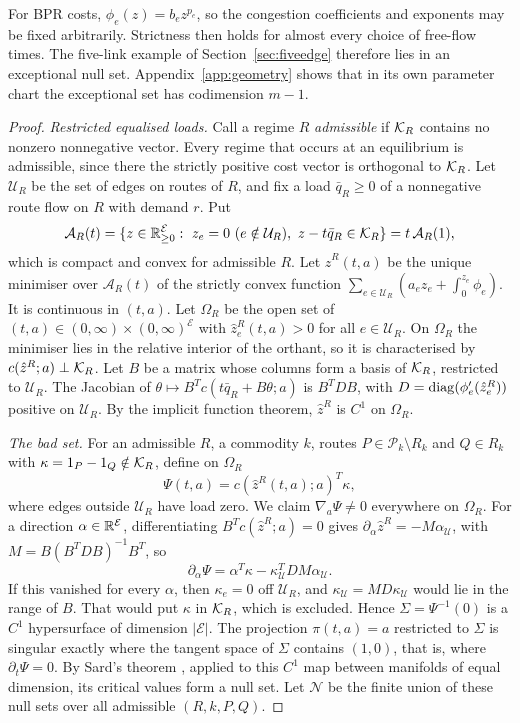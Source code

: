 For BPR costs, $\phi_e(z)=b_ez^{p_e}$, so the congestion coefficients and exponents may be fixed arbitrarily. Strictness then holds for almost every choice of free-flow times. The five-link example of Section~\ref{sec:fiveedge} therefore lies in an exceptional null set. Appendix~\ref{app:geometry} shows that in its own parameter chart the exceptional set has codimension $m-1$.

\begin{proof}
\emph{Restricted equalised loads.} Call a regime $R$ \emph{admissible} if $\mathcal K_R$ contains no nonzero nonnegative vector. Every regime that occurs at an equilibrium is admissible, since there the strictly positive cost vector is orthogonal to $\mathcal K_R$. Let $\mathcal U_R$ be the set of edges on routes of $R$, and fix a load $\bar q_R\ge0$ of a nonnegative route flow on $R$ with demand $r$. Put
\[
 \mathcal A_R(t)=\{z\in\mathbb R^{\mathcal E}_{\ge0}:\ z_e=0\ (e\notin\mathcal U_R),\ z-t\bar q_R\in\mathcal K_R\}=t\,\mathcal A_R(1),
\]
which is compact and convex for admissible $R$. Let $\hat z^R(t,a)$ be the unique minimiser over $\mathcal A_R(t)$ of the strictly convex function $\sum_{e\in\mathcal U_R}(a_ez_e+\int_0^{z_e}\phi_e)$. It is continuous in $(t,a)$. Let $\Omega_R$ be the open set of $(t,a)\in(0,\infty)\times(0,\infty)^{\mathcal E}$ with $\hat z^R_e(t,a)>0$ for all $e\in\mathcal U_R$. On $\Omega_R$ the minimiser lies in the relative interior of the orthant, so it is characterised by $c(\hat z^R;a)\perp\mathcal K_R$. Let $B$ be a matrix whose columns form a basis of $\mathcal K_R$, restricted to $\mathcal U_R$. The Jacobian of $\theta\mapsto B^Tc(t\bar q_R+B\theta;a)$ is $B^TDB$, with $D=\operatorname{diag}(\phi'_e(\hat z^R_e))$ positive on $\mathcal U_R$. By the implicit function theorem, $\hat z^R$ is $C^1$ on $\Omega_R$.

\emph{The bad set.} For an admissible $R$, a commodity $k$, routes $P\in\mathcal P_k\setminus R_k$ and $Q\in R_k$ with $\kappa=1_P-1_Q\notin\mathcal K_R$, define on $\Omega_R$
\[
 \Psi(t,a)=c(\hat z^R(t,a);a)^T\kappa,
\]
where edges outside $\mathcal U_R$ have load zero. We claim $\nabla_a\Psi\ne0$ everywhere on $\Omega_R$. For a direction $\alpha\in\mathbb R^{\mathcal E}$, differentiating $B^Tc(\hat z^R;a)=0$ gives $\partial_\alpha\hat z^R=-M\alpha_{\mathcal U}$, with $M=B(B^TDB)^{-1}B^T$, so
\[
 \partial_\alpha\Psi=\alpha^T\kappa-\kappa_{\mathcal U}^TDM\alpha_{\mathcal U}.
\]
If this vanished for every $\alpha$, then $\kappa_e=0$ off $\mathcal U_R$, and $\kappa_{\mathcal U}=MD\kappa_{\mathcal U}$ would lie in the range of $B$. That would put $\kappa$ in $\mathcal K_R$, which is excluded. Hence $\Sigma=\Psi^{-1}(0)$ is a $C^1$ hypersurface of dimension $|\mathcal E|$. The projection $\pi(t,a)=a$ restricted to $\Sigma$ is singular exactly where the tangent space of $\Sigma$ contains $(1,0)$, that is, where $\partial_t\Psi=0$. By Sard's theorem \cite{Sard1942}, applied to this $C^1$ map between manifolds of equal dimension, its critical values form a null set. Let $\mathcal N$ be the finite union of these null sets over all admissible $(R,k,P,Q)$.


\end{proof}

